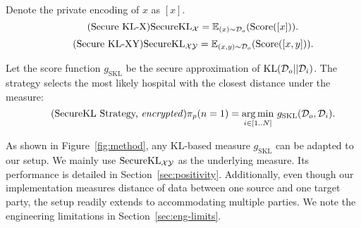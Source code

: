 Denote the private encoding of $x$ as $[x]$.
\begin{equation}
\tag{Secure KL-X}
\mathrm{Secure}\mathrm{KL}_\mathcal{X} = \mathbb{E}_{(x)\sim \mathcal{D}_o}(\text{Score}([x])).
\end{equation} 
\begin{equation}
\tag{Secure KL-XY}
\mathrm{Secure}\mathrm{KL}_{\mathcal{X}\mathcal{Y}}= \mathbb{E}_{(x,y)\sim \mathcal{D}_o}(\text{Score}([x, y])).
\end{equation} 

Let the score function $g_\mathrm{SKL}$ be the secure approximation of $ \mathrm{KL}(\mathcal{D}_o||\mathcal{D}_i)$. The strategy selects the most likely hospital with the closest distance under the measure:
\begin{equation}
\tag{SecureKL Strategy, \emph{encrypted}}
\pi_p (n=1) = \argmin _{i\in [1..N]} \, g_\mathrm{SKL}(\Do,\Di).
\end{equation}

As shown in Figure~\ref{fig:method}, any KL-based measure $g_\mathrm{SKL}$ can be adapted to our setup. We mainly use $\mathrm{Secure}\mathrm{KL}_{\mathcal{X}\mathcal{Y}}$ as the underlying measure. Its performance is detailed in Section~\ref{sec:positivity}. 
Additionally, even though our implementation measures distance of data between one source and one target party, the setup readily extends to accommodating multiple parties. We note the engineering limitations in Section~\ref{sec:eng-limits}.
